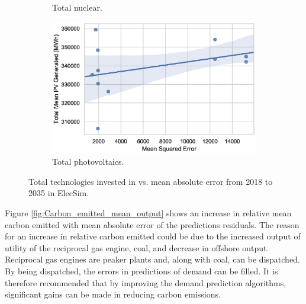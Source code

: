 \begin{figure}[h!]
\begin{subfigure}[b]{0.3\textwidth}
\caption{Total nuclear.}
\label{fig:total_nuclear_mean_output}
\end{subfigure}
\hfil
\begin{subfigure}[b]{0.3\textwidth}  
\includegraphics[width=\columnwidth]{Chapter5/figures/market-forecasting/results/elecsim_results/results_2/total_PV_mean_output.eps}
\caption{Total photovoltaics.}
\label{fig:total_PV_mean_output}
\end{subfigure}
\label{fig:ccgt_coal_onshore_offshore_totals}
\caption{Total technologies invested in vs. mean absolute error from 2018 to 2035 in ElecSim.}
\end{figure}




Figure \ref{fig:Carbon_emitted_mean_output} shows an increase in relative mean carbon emitted with mean absolute error of the predictions residuals. The reason for an increase in relative carbon emitted could be due to the increased output of utility of the reciprocal gas engine, coal, and decrease in offshore output. Reciprocal gas engines are peaker plants and, along with coal, can be dispatched. By being dispatched, the errors in predictions of demand can be filled. It is therefore recommended that by improving the demand prediction algorithms, significant gains can be made in reducing carbon emissions.



